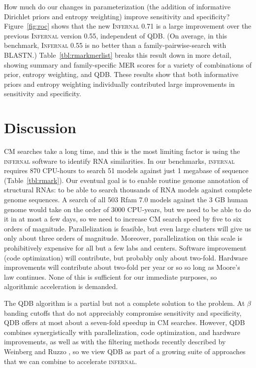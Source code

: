 \documentclass[11pt]{article}
\newif\ifdraft
\begin{document}
\ifdraft

\fi

How much do our changes in parameterization (the addition of
informative Dirichlet priors and entropy weighting) improve
sensitivity and specificity? Figure~\ref{fig:roc} shows that the new
\textsc{Infernal} 0.71 is a large improvement over the previous
\textsc{Infernal} version 0.55, independent of QDB. (On average, in
this benchmark, \textsc{Infernal} 0.55 is no better than a
family-pairwise-search with BLASTN.) Table~\ref{tbl:rmarkmerlist}
breaks this result down in more detail, showing summary and
family-specific MER scores for a variety of combinations of prior,
entropy weighting, and QDB. These results show that both informative
priors and entropy weighting individually contributed large
improvements in sensitivity and specificity.

\ifdraft

\fi


\section{Discussion}

CM searches take a long time, and this is the most limiting factor is
using the \textsc{infernal} software to identify RNA similarities. In
our benchmarks, \textsc{infernal} requires 870 CPU-hours to search 51
models against just 1 megabase of sequence
(Table~\ref{tbl:rmark}). Our eventual goal is to enable routine genome
annotation of structural RNAs: to be able to search thousands of RNA
models against complete genome sequences. A search of all 503 Rfam 7.0
models against the 3 GB human genome would take on the order of 3000
CPU-years, but we need to be able to do it in at most a few days, so
we need to increase CM search speed by five to six orders of
magnitude. Parallelization is feasible, but even large clusters will
give us only about three orders of magnitude.  Moreover,
parallelization on this scale is prohibitively expensive for all but a
few labs and centers. Software improvement (code optimization) will
contribute, but probably only about two-fold.  Hardware improvements
will contribute about two-fold per year or so so long as Moore's law
continues. None of this is sufficient for our immediate purposes, so
algorithmic acceleration is demanded.

The QDB algorithm is a partial but not a complete solution to the
problem. At $\beta$ banding cutoffs that do not appreciably compromise
sensitivity and specificity, QDB offers at most about a seven-fold
speedup in CM searches. However, QDB combines synergistically with
parallelization, code optimization, and hardware improvements, as well
as with the filtering methods recently described by Weinberg and Ruzzo
\cite{Weinberg04,Weinberg04b,Weinberg05}, so we view QDB as part of a
growing suite of approaches that we can combine to accelerate
\textsc{infernal}.
\end{document}
